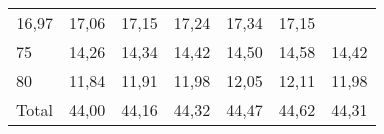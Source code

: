 \begin{tabular}{lllllll}
  \multicolumn{1}{|r}{16,97} &
  \multicolumn{1}{r}{17,06} &
  \multicolumn{1}{r}{17,15} &
  \multicolumn{1}{r}{17,24} &
  \multicolumn{1}{r}{17,34} &
  \multicolumn{1}{r}{17,15} \\
\multicolumn{1}{l}{\hspace{1em}75} &
  \multicolumn{1}{|r}{14,26} &
  \multicolumn{1}{r}{14,34} &
  \multicolumn{1}{r}{14,42} &
  \multicolumn{1}{r}{14,50} &
  \multicolumn{1}{r}{14,58} &
  \multicolumn{1}{r}{14,42} \\
\multicolumn{1}{l}{\hspace{1em}80} &
  \multicolumn{1}{|r}{11,84} &
  \multicolumn{1}{r}{11,91} &
  \multicolumn{1}{r}{11,98} &
  \multicolumn{1}{r}{12,05} &
  \multicolumn{1}{r}{12,11} &
  \multicolumn{1}{r}{11,98} \\
\multicolumn{1}{l}{\hspace{1em}Total} &
  \multicolumn{1}{|r}{44,00} &
  \multicolumn{1}{r}{44,16} &
  \multicolumn{1}{r}{44,32} &
  \multicolumn{1}{r}{44,47} &
  \multicolumn{1}{r}{44,62} &
  \multicolumn{1}{r}{44,31} \\
\cline{1-7}
\end{tabular}

